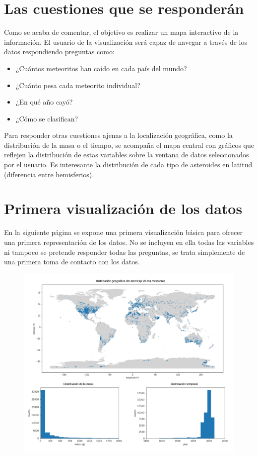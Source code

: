 \documentclass[12pt]{article}
\begin{document}
    \section{Las cuestiones que se responderán}
    Como se acaba de comentar, el objetivo es realizar un mapa interactivo de la información. El usuario de la visualización será capaz de navegar a través de los datos respondiendo preguntas como:
    \begin{itemize}
    	\item ¿Cuántos meteoritos han caído en cada país del mundo?
    	\item ¿Cuánto pesa cada meteorito individual?
    	\item ¿En qué año cayó?
    	\item ¿Cómo se clasifican?
    \end{itemize}
    Para responder otras cuestiones ajenas a la localización geográfica, como la distribución de la masa o el tiempo, se acompaña el mapa central con gráficos que reflejen la distribución de estas variables sobre la ventana de datos seleccionados por el usuario. Es interesante la distribución de cada tipo de asteroides en latitud (diferencia entre hemisferios).
    \section{Primera visualización de los datos}
    En la siguiente página se expone una primera visualización básica para ofrecer una primera representación de los datos. No se incluyen en ella todas las variables ni tampoco se pretende responder todas las preguntas, se trata simplemente de una primera toma de contacto con los datos.
    \clearpage
    \begin{figure}
    	\centering
    	\vspace*{-1.5cm}
    	\hspace*{-1.3in}
    	\includegraphics[scale=1.04]{pra1_visualization}
    	\label{rlexample}
    \end{figure}
    
    
	
	
\end{document}

